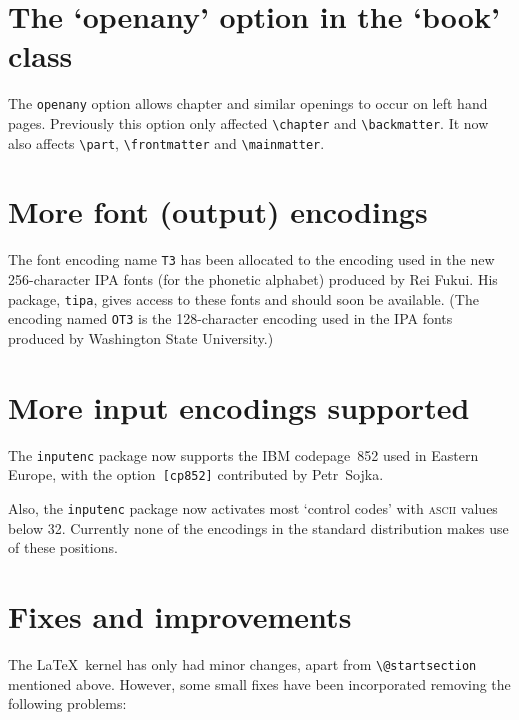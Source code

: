 \documentclass{ltnews}
\providecommand\pkg[1]{\texttt{#1}}
\providecommand\option[1]{\texttt{#1}}
\begin{document}
\section{The `openany' option in the `book' class}
The \option{openany} option allows chapter and similar openings to
occur on left hand pages. Previously this option only affected
\verb|\chapter| and \verb|\backmatter|. It now also affects
\verb|\part|, \verb|\frontmatter| and \verb|\mainmatter|.

\section{More font (output) encodings}
The font encoding name \texttt{T3} has been allocated to the encoding
used in the new 256-character \textsc{IPA} fonts (for the phonetic
alphabet) produced by Rei Fukui. His package, \pkg{tipa},
gives access to these fonts and should soon be available.  (The
encoding named \texttt{OT3} is the 128-character encoding used in the
\textsc{IPA} fonts produced by Washington State University.)



\section{More input encodings supported}
The \pkg{inputenc} package now supports the IBM codepage~852 used
in Eastern Europe, with the option~\texttt{[cp852]} contributed by
Petr~Sojka.

Also, the \pkg{inputenc} package now activates most `control codes'
with \textsc{ascii} values below 32.
Currently none of the encodings in the standard distribution makes use
of these positions.

\section{Fixes and improvements}
The \LaTeX\ kernel has only had minor changes, apart from
\verb|\@startsection| mentioned above.
However, some small fixes have been incorporated removing the
following problems:
\end{document}
